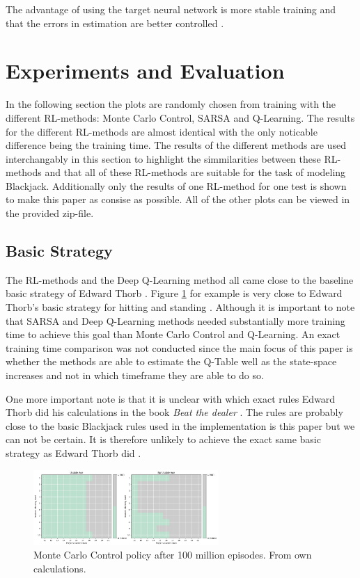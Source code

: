 \documentclass[conference]{IEEEtran}
\begin{document}
The advantage of using the target neural network is more stable training and that the errors in estimation are better controlled \cite{b6}.



\section{Experiments and Evaluation}
In the following section the plots are randomly chosen from training with the different RL-methods: Monte Carlo Control, SARSA and Q-Learning. 
The results for the different RL-methods are almost identical with the only noticable difference being the training time.  
The results of the different methods are used interchangably in this section to highlight the simmilarities between these RL-methods and that all of these RL-methods are suitable for the task of modeling Blackjack. 
Additionally only the results of one RL-method for one test is shown to make this paper as consise as possible. 
All of the other plots can be viewed in the provided zip-file.

\subsection{Basic Strategy}
The RL-methods and the Deep Q-Learning method all came close to the baseline basic strategy of Edward Thorb \cite{b1}.
Figure \ref{fig:monte-carlo-basic-strategy} for example is very close to Edward Thorb's basic strategy for hitting and standing \cite{b1}. 
Although it is important to note that SARSA and Deep Q-Learning  methods needed substantially more training time to achieve this goal than Monte Carlo Control and Q-Learning. 
An exact training time comparison was not conducted since the main focus of this paper is whether the methods are able to estimate the Q-Table well as the state-space increases and not in which timeframe they are able to do so.

One more important note is that it is unclear with which exact rules Edward Thorb did his calculations in the book \textit{Beat the dealer} \cite{b1}. 
The rules are probably close to the basic Blackjack rules used in the implementation is this paper but we can not be certain. 
It is therefore unlikely to achieve the exact same basic strategy as Edward Thorb did \cite{b1}.

\begin{figure}
	\centering
	\includegraphics[width=70mm]{figures/MC/basic-100-million/policy.png}
	\caption{Monte Carlo Control policy after 100 million episodes. From own calculations.}
	\label{fig:monte-carlo-basic-strategy}
\end{figure}
\end{document}
